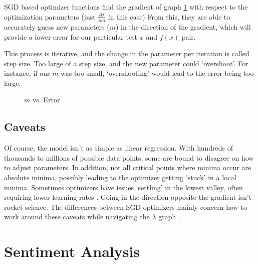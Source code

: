 \documentclass[titlepage,letterpaper]{article}
\begin{document}
SGD based optimizer functions find the gradient of graph \cref{fig:m_vs_error} with respect to the optimization parameters (just $\frac{\partial\lambda}{\partial m}$ in this case) \cite{learn} From this, they are able to accurately guess new parameters ($m$) in the direction of the gradient, which will provide a lower error for our particular test \(x\) and \(f(x)\) pair. 

This process is iterative, and the change in the parameter per iteration is called step size. Too large of a step size, and the new parameter could `overshoot'. For instance, if our $m$ was too small, `overshooting' would lead to the error being too large.


\begin{figure}
	\vspace*{-.8in}
	\centering
\caption{ \(m\) vs. Error}
\label{fig:m_vs_error}
\def\svgwidth{1.5 in}

\end{figure}

\subsection{Caveats}
Of course, the model isn't as simple as linear regression. With hundreds of thousands to millions of possible data points, some are bound to disagree on how to adjust parameters. In addition, not all critical points where minima occur are absolute minima, possibly leading to the optimizer  getting `stuck' in a local minima. Sometimes optimizers have issues `settling' in the lowest valley, often requiring lower learning rates \cite{adaprop}. Going in the direction opposite the gradient isn't rocket science. The differences between SGD optimizers mainly concern how to work around these caveats while navigating the $\lambda$ graph \cite{adaprop,adam,rmsprop,moment}.

\section{Sentiment Analysis}
\end{document}
